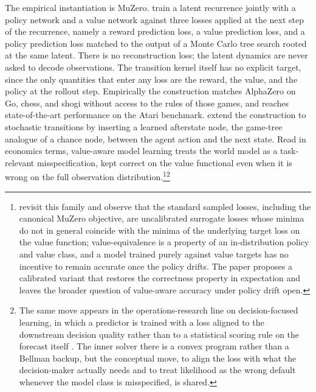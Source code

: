 The empirical instantiation is MuZero. \citet{Schrittwieser2020MuZero} train a latent recurrence jointly with a policy network and a value network against three losses applied at the next step of the recurrence, namely a reward prediction loss, a value prediction loss, and a policy prediction loss matched to the output of a Monte Carlo tree search rooted at the same latent. There is no reconstruction loss; the latent dynamics are never asked to decode observations. The transition kernel itself has no explicit target, since the only quantities that enter any loss are the reward, the value, and the policy at the rollout step. Empirically the construction matches AlphaZero on Go, chess, and shogi without access to the rules of those games, and reaches state-of-the-art performance on the Atari benchmark. \citet{Antonoglou2022StochMuZero} extend the construction to stochastic transitions by inserting a learned afterstate node, the game-tree analogue of a chance node, between the agent action and the next state. Read in economics terms, value-aware model learning treats the world model as a task-relevant misspecification, kept correct on the value functional even when it is wrong on the full observation distribution.\footnote{\citet{VoelckerCalib2025} revisit this family and observe that the standard sampled losses, including the canonical MuZero objective, are uncalibrated surrogate losses whose minima do not in general coincide with the minima of the underlying target loss on the value function; value-equivalence is a property of an in-distribution policy and value class, and a model trained purely against value targets has no incentive to remain accurate once the policy drifts. The paper proposes a calibrated variant that restores the correctness property in expectation and leaves the broader question of value-aware accuracy under policy drift open.}\footnote{The same move appears in the operations-research line on decision-focused learning, in which a predictor is trained with a loss aligned to the downstream decision quality rather than to a statistical scoring rule on the forecast itself \citep{DontiAmosKolter2017}. The inner solver there is a convex program rather than a Bellman backup, but the conceptual move, to align the loss with what the decision-maker actually needs and to treat likelihood as the wrong default whenever the model class is misspecified, is shared.}
